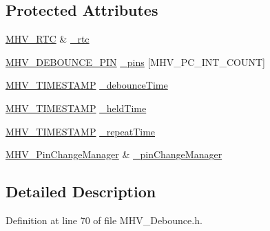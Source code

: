 \subsection*{\-Protected \-Attributes}
\begin{DoxyCompactItemize}
\item 
\hyperlink{class_m_h_v___r_t_c}{\-M\-H\-V\-\_\-\-R\-T\-C} \& \hyperlink{class_m_h_v___debounce_a5594f588099ccfcff2b3b23b503e8f6d}{\-\_\-rtc}
\item 
\hyperlink{_m_h_v___debounce_8h_a1e51966b7fb269bd10a163734aa1ddfb}{\-M\-H\-V\-\_\-\-D\-E\-B\-O\-U\-N\-C\-E\-\_\-\-P\-I\-N} \hyperlink{class_m_h_v___debounce_a5cf65bfecfc0efd4d51e1506972d2796}{\-\_\-pins} \mbox{[}\-M\-H\-V\-\_\-\-P\-C\-\_\-\-I\-N\-T\-\_\-\-C\-O\-U\-N\-T\mbox{]}
\item 
\hyperlink{_m_h_v___r_t_c_8h_a1e30d3a92b1b868286bd0d619245d8a6}{\-M\-H\-V\-\_\-\-T\-I\-M\-E\-S\-T\-A\-M\-P} \hyperlink{class_m_h_v___debounce_ac3d3f83d43cbb2c7b4b74244c75d593a}{\-\_\-debounce\-Time}
\item 
\hyperlink{_m_h_v___r_t_c_8h_a1e30d3a92b1b868286bd0d619245d8a6}{\-M\-H\-V\-\_\-\-T\-I\-M\-E\-S\-T\-A\-M\-P} \hyperlink{class_m_h_v___debounce_a051a7a07c755f52f4444075ff897ac82}{\-\_\-held\-Time}
\item 
\hyperlink{_m_h_v___r_t_c_8h_a1e30d3a92b1b868286bd0d619245d8a6}{\-M\-H\-V\-\_\-\-T\-I\-M\-E\-S\-T\-A\-M\-P} \hyperlink{class_m_h_v___debounce_a422167777e3bfcf6b7b46b992058950f}{\-\_\-repeat\-Time}
\item 
\hyperlink{class_m_h_v___pin_change_manager}{\-M\-H\-V\-\_\-\-Pin\-Change\-Manager} \& \hyperlink{class_m_h_v___debounce_a85d99fc351fbd791a4effe8bd8f76f6f}{\-\_\-pin\-Change\-Manager}
\end{DoxyCompactItemize}


\subsection{\-Detailed \-Description}


\-Definition at line 70 of file \-M\-H\-V\-\_\-\-Debounce.\-h.



